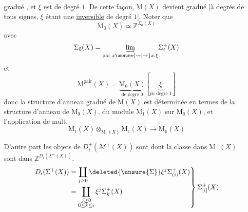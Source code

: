 \uline{gradué} , et $\xi$ est de degré $1$. De cette
façon, $\mathrm{M}(X)$ devient gradué [à degrés
de tous signes, $\xi$ étant une 
\uline{inversible} de degré $1$]. Noter que
\[
\mathrm{M}_0(X)\simeq\mathbb{Z}^{\Sigma_0(X)}
\]
avec
\[
\Sigma_0(X)=\underset{\substack{\longrightarrow\\
\text{par }x\unsure{\rightsquigarrow|\mapsto}x.\xi}}{\lim}\Sigma_i^+(X)
\]
et
\[
\mathrm{M}^{\mathrm{pair}}(X)=
\underbrace{\mathrm{M}_0(X)}_{\text{de degré }0}
[\underbrace{\xi}_{\text{de degré }1}]
\]
\inserted{\[
\mathrm{M}^{\mathrm{impair}}(X)=
\mathrm{M}_1(X)\otimes_{\mathrm{M}_0(X)}\mathrm{M}_0(X)[\xi]
\]}
donc la structure d'anneau gradué
de $\mathrm{M}(X)$ est déterminée en termes de
la structure d'anneau de $\mathrm{M}_0(X)$, 
du module $\mathrm{M}_1(X)$ sur $\mathrm{M}_0(X)$, et l'application de mult.
\[
\mathrm{M}_1(X)\otimes_{\mathrm{M}_0(X)}\mathrm{M}_1(X)
\longrightarrow\mathrm{M}_0(X)
\]

D'autre part les objets de $D_i^+(\mathcal{M}^+(X))$
sont  dont la classe dans
 $\mathrm{M}^+(X)$ sont dans
$\mathbb{Z}^{D_i(\Sigma^+(X))}$.
\[
\left.
\begin{aligned}
D_i(\Sigma^+(X))&=
\coprod_{j\geq0}\deleted{\unsure{\Sigma}}\xi^j\Sigma_{(i)}^+(X)\\
&=\coprod_{\substack{j\geq0\\0\leq k\leq i}}\xi^j\Sigma_k^+(X)
\end{aligned}
\right\}\Sigma_{[i]}^+(X)
\]

